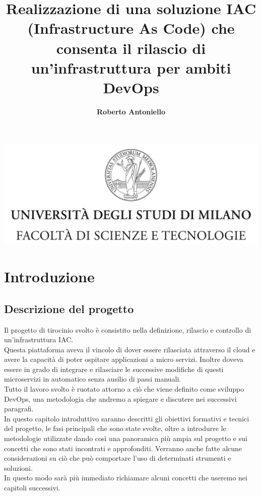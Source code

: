 \documentclass[a4paper,12pt]{report}
\begin{document}
\begin{center}
\includegraphics[width=\textwidth]{Logo.jpg}
\title{Realizzazione di una soluzione IAC (Infrastructure As Code) che consenta il rilascio di un'infrastruttura per ambiti DevOps}
\end{center}
\author{\textbf{Roberto Antoniello}}

\beforepreface

\afterpreface
%  
\chapter{Introduzione}
\section{Descrizione del progetto}
Il progetto di tirocinio svolto è consistito nella definizione, rilascio e controllo di un'infrastruttura IAC.\\
Questa piattaforma aveva il vincolo di dover essere rilasciata attraverso il cloud e avere la capacità di poter ospitare applicazioni a micro servizi. Inoltre doveva essere in grado di integrare e rilasciare le successive modifiche di questi microservizi in automatico senza ausilio di passi manuali.\\
Tutto il lavoro svolto è ruotato attorno a ciò che viene definito come sviluppo DevOps, una metodologia che andremo a spiegare e discutere nei successivi paragrafi. \\
In questo capitolo introduttivo saranno descritti gli obiettivi formativi e tecnici del progetto, le fasi principali che sono state svolte, oltre a introdurre le metodologie utilizzate dando così una panoramica più ampia sul progetto e sui concetti che sono stati incontrati e approfonditi. 
Verranno anche fatte alcune considerazioni su ciò che può comportare l'uso di determinati strumenti e soluzioni.\\
In questo modo sarà più immediato richiamare alcuni concetti che useremo nei capitoli successivi.
\end{document}
